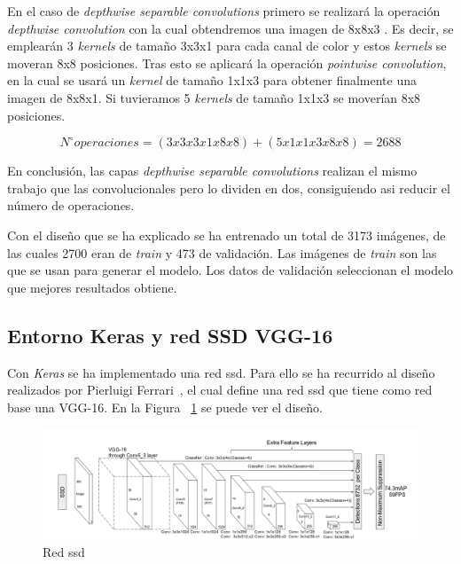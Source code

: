 En el caso de \textit{depthwise separable convolutions} primero se realizará la operación \textit{depthwise convolution} con la cual obtendremos una imagen de 8x8x3 . Es decir, se emplearán 3 \textit{kernels} de tamaño 3x3x1 para cada canal de color y estos \textit{kernels} se moveran 8x8 posiciones. Tras esto se aplicará la operación \textit{pointwise convolution}, en la cual se usará un \textit{kernel} de tamaño 1x1x3 para obtener finalmente una imagen de 8x8x1. Si tuvieramos 5 \textit{kernels} de tamaño 1x1x3 se moverían 8x8 posiciones.

\begin{equation}\label{mobilenet_formula}
N^{\circ} operaciones = (3x3x3x1x8x8) + (5x1x1x3x8x8) = 2688
\end{equation}

En conclusión, las capas \textit{depthwise separable convolutions} realizan el mismo trabajo que las convolucionales pero lo dividen en dos, consiguiendo asi reducir el número de operaciones.

Con el diseño que se ha explicado se ha entrenado un total de 3173 imágenes, de las cuales 2700 eran de \textit{train} y 473 de validación. Las imágenes de \textit{train} son las que se usan para generar el modelo. Los datos de validación seleccionan el modelo que mejores resultados obtiene.

 \subsection{Entorno Keras y red SSD VGG-16}\label{sub.keras}
 
 Con \textit{Keras} se ha implementado una red \acrshort{ssd}. Para ello se ha recurrido al diseño realizados por Pierluigi Ferrari~\cite{ssd_ferrari}, el cual define una red \acrshort{ssd} que tiene como red base una VGG-16. En la Figura ~\ref{fig.ssd_300} se puede ver el diseño.
 
 \begin{figure}[H] 
\begin{center}
	\includegraphics[width=1.1\textwidth]{figures/Diseno_global/ssd300.png}
   \caption{Red \acrshort{ssd}}
	\label{fig.ssd_300}
\end{center}
\end{figure}

